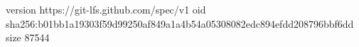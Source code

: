version https://git-lfs.github.com/spec/v1
oid sha256:b01bb1a19303f59d99250af849a1a4b54a05308082edc894efdd208796bbf6dd
size 87544
